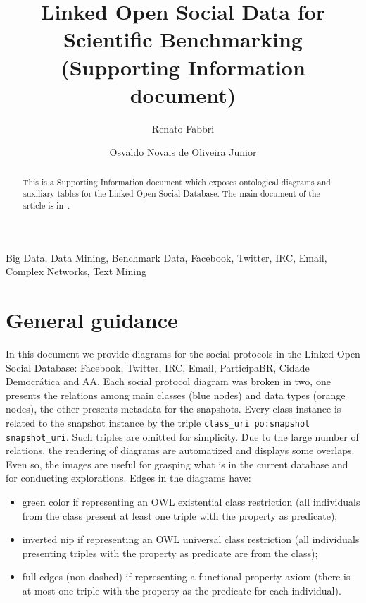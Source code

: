\documentclass[review]{elsarticle}
\newcommand{\textttt}[1] {\texttt{\footnotesize#1}}
\begin{document}
%
\begin{frontmatter}
%
\title{Linked Open Social Data for Scientific Benchmarking (Supporting
Information document)}
%
\author[pwr]{Renato Fabbri}
%
\author[pwr]{Osvaldo Novais de Oliveira Junior}
%
\address[pwr]{S\~ao Carlos Institute of Physics, S\~ao Paulo
University, Brazil}
%
%
\begin{abstract}
This is a Supporting Information document which exposes ontological
diagrams and auxiliary tables for the Linked Open Social Database.
The main document of the article is in~\cite{losd}.
\end{abstract}
%
\begin{keyword}
Big Data, Data Mining, Benchmark Data, Facebook, Twitter, IRC, Email,
Complex Networks, Text Mining
\end{keyword}

\end{frontmatter}
\newcommand{\foo}{\textheight}
\newcommand{\foobar}{\pdfpageheight}
\tableofcontents
\clearpage
\section{General guidance}
In this document we provide diagrams
for the social protocols in the Linked Open Social Database:
Facebook, Twitter, IRC, Email, ParticipaBR, Cidade Democrática and AA.
Each social protocol diagram was broken in two, one presents the relations
among main classes (blue nodes) and data types (orange nodes),
the other presents metadata for the
snapshots.
Every class instance is related to the snapshot instance
by the triple \textttt{class\_uri po:snapshot snapshot\_uri}.
Such triples are omitted for simplicity.
Due to the large number of relations, the rendering of diagrams are
automatized and displays some overlaps.
Even so, the images are useful for grasping what is in the current
database and for conducting explorations.
Edges in the diagrams have:
\begin{itemize}
    \item green color if representing an OWL existential
class restriction (all individuals from the class present at least one triple with
the property as predicate);
    \item inverted nip if representing an OWL universal class
        restriction (all individuals presenting triples with the
        property as predicate are from the class);
    \item full edges (non-dashed) if representing a functional property
        axiom (there is at most one triple with the property as the
        predicate for each individual).
\end{itemize}
\end{document}
